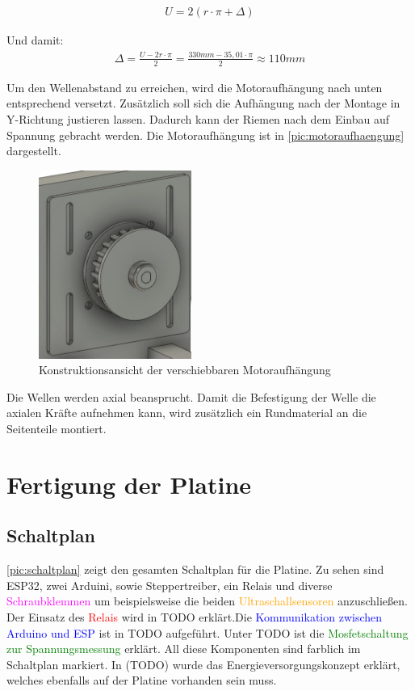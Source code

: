 \begin{align}
	U = 2 (r \cdot \pi+ \Delta) 
\end{align}

Und damit: 
\begin{align}	
	\Delta = \frac{U - 2r \cdot \pi}{2} = \frac{330mm - 35,01 \cdot \pi}{2} \approx 110mm 
\end{align}

Um den Wellenabstand zu erreichen, wird die Motoraufhängung nach unten entsprechend versetzt. Zusätzlich soll sich die Aufhängung nach der Montage in Y-Richtung justieren lassen. Dadurch kann der Riemen nach dem Einbau auf Spannung gebracht werden. Die Motoraufhängung ist in \autoref{pic:motoraufhaengung} dargestellt. 


\begin{figure}[h]
	\centering
	\includegraphics[width=5cm]{motoraufhaengung.png}
	\caption{Konstruktionsansicht der verschiebbaren Motoraufhängung}
	\label{pic:motoraufhaengung}
\end{figure}

Die Wellen werden axial beansprucht. Damit die Befestigung der Welle die axialen Kräfte aufnehmen kann, wird zusätzlich ein Rundmaterial an die Seitenteile montiert. 
\newpage

\chapter{Fertigung der Platine}
\section{Schaltplan}
\autoref{pic:schaltplan} zeigt den gesamten Schaltplan für die Platine. Zu sehen sind ESP32, zwei Arduini, sowie Steppertreiber, ein Relais und diverse \textcolor{magenta}{Schraubklemmen} um beispielsweise die beiden \textcolor{orange}{Ultraschallsensoren} anzuschließen. Der Einsatz des \textcolor{red}{Relais} wird in TODO erklärt.Die \textcolor{blue}{Kommunikation zwischen Arduino und ESP} ist in TODO aufgeführt. Unter TODO ist die \textcolor{green}{Mosfetschaltung zur Spannungsmessung} erklärt. All diese Komponenten sind farblich im Schaltplan markiert. In (TODO) wurde das Energieversorgungskonzept erklärt, welches ebenfalls auf der Platine vorhanden sein muss.

